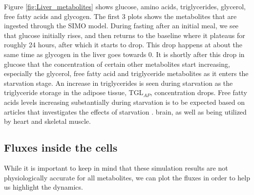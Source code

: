\documentclass{IEEEtran}
\begin{document}
Figure \ref{fig:Liver_metabolites} shows glucose, amino acids, triglycerides, glycerol, free fatty acids and glycogen. The first 3 plots shows the metabolites that are ingested through the SIMO model. During fasting after an initial meal, we see that glucose initially rises, and then returns to the baseline where it plateaus for roughly 24 hours, after which it starts to drop. This drop happens at about the same time as glycogen in the liver goes towards 0. It is shortly after this drop in glucose that the concentration of certain other metabolites start increasing, especially the glycerol, free fatty acid and triglyceride metabolites as it enters the starvation stage. An increase in triglycerides is seen during starvation as the triglyceride storage in the adipose tissue, TGL$_{AP}$, concentration drops. Free fatty acids levels increasing substantially during starvation is to be expected based on articles that investigates the effects of starvation \cite{unger_eisentraut_madison_1963, yaffe_1980A}.
brain, as well as being utilized by heart and skeletal muscle.\\

\subsection{Fluxes inside the cells}

While it is important to keep in mind that these simulation results are not physiologically accurate for all metabolites, we can plot the fluxes in order to help us highlight the dynamics.
\end{document}
